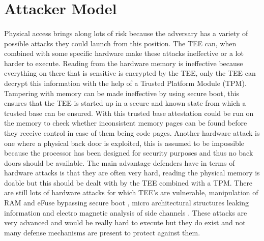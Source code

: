 \documentclass{report}
\begin{document}
\section{Attacker Model}

\paragraph*{}
Physical access brings along lots of risk because the adversary has a variety of possible attacks they could launch from this position. The TEE can, when combined with some specific hardware make these attacks ineffective or a lot harder to execute. Reading from the hardware memory is ineffective because everything on there that is sensitive is encrypted by the TEE, only the TEE can decrypt this information with the help of a Trusted Platform Module (TPM). Tampering with memory can be made ineffective by using secure boot, this ensures that the TEE is started up in a secure and known state from which a trusted base can be ensured. With this trusted base attestation could be run on the memory to check whether inconsistent memory pages can be found before they receive control in case of them being code pages. Another hardware attack is one where a physical back door is exploited, this is assumed to be impossible because the processor has been designed for security purposes and thus no back doors should be available. The main advantage defenders have in terms of hardware attacks is that they are often very hard, reading the physical memory is doable but this should be dealt with by the TEE combined with a TPM. There are still lots of hardware attacks for which TEE's are vulnerable, manipulation of RAM and eFuse bypassing secure boot \cite{GrossMathieu2021BTmi}, micro architectural structures leaking information \cite{RyanKeegan2019HHEE} and electro magnetic analysis of side channels \cite{BukasaSebanjilaKevin2018HTCB}. These attacks are very advanced and would be really hard to execute but they do exist and not many defense mechanisms are present to protect against them.
\end{document}
